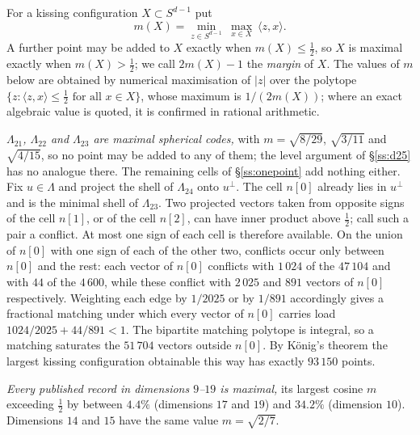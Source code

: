 \documentclass[11pt]{amsart}
\theoremstyle{remark}
\newcommand{\Leech}{\Lambda_{24}}
\newcommand{\ip}[2]{\langle #1,#2\rangle}
\begin{document}
For a kissing configuration $X\subset S^{d-1}$ put
\[
  m(X)=\min_{z\in S^{d-1}}\ \max_{x\in X}\ \ip{z}{x}.
\]
A further point may be added to $X$ exactly when $m(X)\le\tfrac12$, so $X$ is
maximal exactly when $m(X)>\tfrac12$; we call $2m(X)-1$ the \emph{margin} of
$X$. The values of $m$ below are obtained by numerical maximisation of $|z|$ over
the polytope $\{z:\ip{z}{x}\le\tfrac12 \text{ for all } x\in X\}$, whose maximum
is $1/(2m(X))$; where an exact algebraic value is quoted, it is confirmed in
rational arithmetic.

\emph{$\Lambda_{21}$, $\Lambda_{22}$ and $\Lambda_{23}$ are maximal spherical
codes,} with $m=\sqrt{8/29}$, $\sqrt{3/11}$ and $\sqrt{4/15}$, so no point may be
added to any of them; the level argument of \S\ref{ss:d25} has no analogue
there. The remaining cells of \S\ref{ss:onepoint} add nothing either. Fix
$u\in\Lambda$ and project the shell of $\Leech$ onto $u^\perp$. The cell $n[0]$
already lies in $u^\perp$ and is the minimal shell of $\Lambda_{23}$. Two
projected vectors taken from opposite signs of the cell $n[1]$, or of the cell
$n[2]$, can have inner product above $\tfrac12$; call such a pair a conflict. At
most one sign of each cell is therefore available. On the union of $n[0]$ with
one sign of each of the other two, conflicts occur only between $n[0]$ and the
rest: each vector of $n[0]$ conflicts with $1\,024$ of the $47\,104$ and with
$44$ of the $4\,600$, while these conflict with $2\,025$ and $891$ vectors of
$n[0]$ respectively. Weighting each edge by
$1/2025$ or by $1/891$ accordingly gives a fractional matching under which every
vector of $n[0]$ carries load $1024/2025+44/891<1$. The bipartite matching
polytope is integral, so a matching saturates the $51\,704$ vectors outside
$n[0]$. By K\"onig's theorem the largest kissing configuration obtainable this
way has exactly $93\,150$ points.

\emph{Every published record in dimensions $9$--$19$ is maximal,} its largest cosine
$m$ exceeding $\tfrac12$ by between $4.4\%$ (dimensions $17$ and $19$) and $34.2\%$
(dimension $10$). Dimensions $14$ and $15$ have the same value $m=\sqrt{2/7}$.
\end{document}
